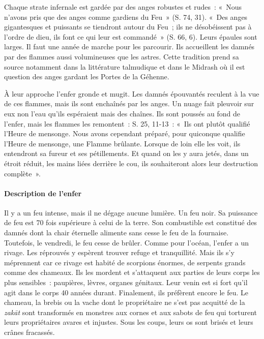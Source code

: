 
Chaque strate infernale est gardée par des anges robustes et rudes~:
«~Nous n'avons pris que des anges comme gardiens du Feu~» (S. 74, 31).
«~Des anges gigantesques et puissants se tiendront autour du Feu~; ils
ne désobéissent pas à l'ordre de dieu, ils font ce qui leur est
commandé~» (S. 66, 6). Leurs épaules sont larges. Il faut une année de
marche pour les parcourir. Ils accueillent les damnés par des flammes
aussi volumineuses que les astres. Cette tradition prend sa source
notamment dans la littérature talmudique et dans le Midrash où il est
question des anges gardant les Portes de la Géhenne.

À leur approche l'enfer gronde et mugit. Les damnés épouvantés reculent
à la vue de ces flammes, mais ils sont enchaînés par les anges. Un nuage
fait pleuvoir sur eux non l'eau qu'ils espéraient mais des chaînes. Ils
sont poussés au fond de l'enfer, mais les flammes les remontent~: S. 25,
11-13~: «~Ils ont plutôt qualifié l'Heure de mensonge. Nous avons
cependant préparé, pour quiconque qualifie l'Heure de mensonge, une
Flamme brûlante. Lorsque de loin elle les voit, ils entendront sa fureur
et ses pétillements. Et quand on les y aura jetés, dans un étroit
réduit, les mains liées derrière le cou, ils souhaiteront alors leur
destruction complète~».


\paragraph{Description de l'enfer}\label{description-de-lenfer}

Il y a un feu intense, mais il ne dégage aucune lumière. Un feu noir. Sa
puissance de feu est 70 fois supérieure à celui de la terre. Son
combustible est constitué des damnés dont la chair éternelle alimente
sans cesse le feu de la fournaise. Toutefois, le vendredi, le feu cesse
de brûler. Comme pour l'océan, l'enfer a un rivage. Les réprouvés y
espèrent trouver refuge et tranquillité. Mais ils s'y méprennent car ce
rivage est habité de scorpions énormes, de serpents grands comme des
chameaux. Ils les mordent et s'attaquent aux parties de leurs corps les
plus sensibles~: paupières, lèvres, organes génitaux. Leur venin est si
fort qu'il agit dans le corps 40 années durant. Finalement, ils
préfèrent encore le feu. Le chameau, la brebis ou la vache dont le
propriétaire ne s'est pas acquitté de la \emph{zakāt} sont transformés
en monstres aux cornes et aux sabots de feu qui torturent leurs
propriétaires avares et injustes. Sous les coups, leurs os sont brisés
et leurs crânes fracassés.

